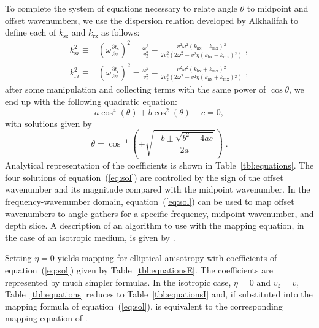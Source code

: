 To complete the system of equations necessary to relate angle $\theta$ to midpoint and offset  
wavenumbers, we use the dispersion
relation developed by Alkhalifah  to define each of $k_{\text{sz}}$ and $k_{\text{rz}}$ as follows:
\begin{eqnarray}
  \label{eq:kzs}
  k_{\text{sz}}^2  \equiv & (\omega \frac{\partial t_{\text{s}}}{\partial z})^2=\frac{\omega ^2}{v_z^2}-\frac{v^2 \omega ^2
   \left(k_{\text{hx}}-k_{\text{mx}}\right){}^2}{2 v_z^2 \left(2 \omega ^2-v^2 \eta 
   \left(k_{\text{hx}}-k_{\text{mx}}\right){}^2\right)}\;,
  \\ \label{eq:kzr}
  k_{\text{rz}}^2  \equiv & (\omega \frac{\partial t_{\text{r}}}{\partial z})^2=\frac{\omega ^2}{v_z^2}-\frac{v^2 \omega ^2
   \left(k_{\text{hx}}+k_{\text{mx}}\right){}^2}{2 v_z^2 \left(2 \omega ^2-v^2 \eta 
   \left(k_{\text{hx}}+k_{\text{mx}}\right){}^2\right)}\;,
\end{eqnarray}
 after some manipulation 
and collecting terms with the same power of  $\cos \theta$, we end up with the following quadratic equation:
\begin{equation}
  \label{eq:quad}
  a \cos ^4(\theta )+b \cos ^2(\theta )+c=0,
\end{equation}
with solutions given by
\begin{equation}
 \theta =  \cos^{-1}\left(\pm \sqrt{\frac{-b\pm \sqrt{b^2-4 a
   c}}{2 a}}\right)\;.
  \label{eq:sol}
\end{equation}
Analytical representation of the coefficients is shown in
Table~\ref{tbl:equations}.  The four solutions of
equation~(\ref{eq:sol}) are controlled by the sign of the offset
wavenumber and its magnitude compared with the midpoint wavenumber.
In the frequency-wavenumber domain, equation~(\ref{eq:sol}) can be
used to map offset  wavenumbers to angle gathers for a specific
frequency, midpoint  wavenumber, and depth slice. A description of an
algorithm to use with the mapping equation, in the case of an isotropic
medium, is given by \cite{SEG-2004-10531056}.

Setting $\eta=0$ yields mapping for elliptical anisotropy with
coefficients of equation~(\ref{eq:sol}) given by
Table~\ref{tbl:equationsE}. The coefficients are represented by much
simpler formulas. In the isotropic case, $\eta=0$ and $v_z=v$,
Table~\ref{tbl:equations} reduces to Table~\ref{tbl:equationsI} and,
if substituted into the mapping formula of equation~(\ref{eq:sol}), is
equivalent to the corresponding mapping equation of
\cite{SEG-2004-10531056}.

